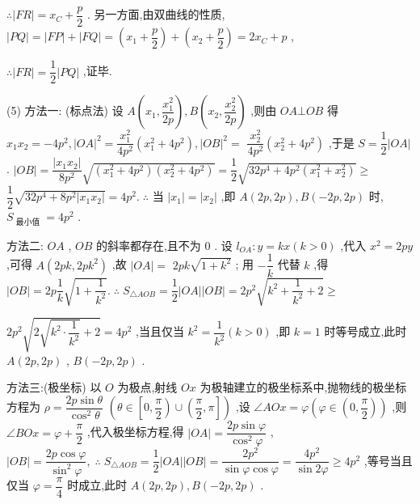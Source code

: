 $\therefore \left| {FR}\right|  = {x}_{C} + \dfrac{p}{2}$ . 另一方面,由双曲线的性质, $\left| {PQ}\right|  = \left| {FP}\right|  + \left| {FQ}\right|  = \left( {{x}_{1} + \dfrac{p}{2}}\right)  + \left( {{x}_{2} + \dfrac{p}{2}}\right)  = 2{x}_{C} + p$ ,

$\therefore \left| {FR}\right|  = \dfrac{1}{2}\left| {PQ}\right|$ ,证毕.

(5) 方法一: (标点法) 设 $A\left( {{x}_{1},\dfrac{{x}_{1}^{2}}{2p}}\right) ,B\left( {{x}_{2},\dfrac{{x}_{2}^{2}}{2p}}\right)$ ,则由 ${OA}\bot {OB}$ 得 ${x}_{1}{x}_{2} =  - 4{p}^{2},{\left| OA\right| }^{2} = \dfrac{{x}_{1}^{2}}{4{p}^{2}}\left( {{x}_{1}^{2} + 4{p}^{2}}\right) ,{\left| OB\right| }^{2} =$  $\dfrac{{x}_{2}^{2}}{4{p}^{2}}\left( {{x}_{2}^{2} + 4{p}^{2}}\right)$ ,于是 $S = \dfrac{1}{2}\left| {OA}\right|$ . $\left| {OB}\right|  = \dfrac{\left| {x}_{1}{x}_{2}\right| }{8{p}^{2}}\sqrt{\left( {{x}_{1}^{2} + 4{p}^{2}}\right) \left( {{x}_{2}^{2} + 4{p}^{2}}\right) } = \dfrac{1}{2}\sqrt{{32}{p}^{4} + 4{p}^{2}\left( {{x}_{1}^{2} + {x}_{2}^{2}}\right) } \geq$  $\dfrac{1}{2}\sqrt{{32}{p}^{4} + 8{p}^{2}\left| {{x}_{1}{x}_{2}}\right| } = 4{p}^{2}.\;\therefore$ 当 $\left| {x}_{1}\right|  = \left| {x}_{2}\right|$ ,即 $A\left( {{2p},{2p}}\right) ,B\left( {-{2p},{2p}}\right)$ 时, ${S}_{\text{ 最小值 }} = 4{p}^{2}$ .

方法二: ${OA}$ , ${OB}$ 的斜率都存在,且不为 0 . 设 ${l}_{OA} : y = {kx}\left( {k > 0}\right)$ ,代入 ${x}^{2} = {2py}$ ,可得 $A\left( {{2pk},{2p}{k}^{2}}\right)$ ,故 $\left| {OA}\right|  =$  ${2pk}\sqrt{1 + {k}^{2}}$ ; 用 $- \dfrac{1}{k}$ 代替 $k$ ,得 $\left| {OB}\right|  = {2p}\dfrac{1}{k}\sqrt{1 + \dfrac{1}{{k}^{2}}}.\;\therefore \;{S}_{\bigtriangleup {AOB}} = \dfrac{1}{2}\left| {OA}\right| \left| {OB}\right|  = 2{p}^{2}\sqrt{{k}^{2} + \dfrac{1}{{k}^{2}} + 2} \geq$

$2{p}^{2}\sqrt{2\sqrt{{k}^{2} \cdot  \dfrac{1}{{k}^{2}}} + 2} = 4{p}^{2}$ ,当且仅当 ${k}^{2} = \dfrac{1}{{k}^{2}}\left( {k > 0}\right)$ ,即 $k = 1$ 时等号成立,此时 $A\left( {{2p},{2p}}\right)$ , $B\left( {-{2p},{2p}}\right)$ .

方法三:(极坐标) 以 $O$ 为极点,射线 ${Ox}$ 为极轴建立的极坐标系中,抛物线的极坐标方程为 $\rho  = \dfrac{{2p}\sin \theta }{{\cos }^{2}\theta }$  $\left( {\theta  \in  \left\lbrack  {0,\dfrac{\pi }{2}}\right)  \cup  \left( {\dfrac{\pi }{2},\pi }\right\rbrack  }\right)$ ,设 $\angle {AOx} = \varphi \left( {\varphi  \in  \left( {0,\dfrac{\pi }{2}}\right) }\right)$ ,则 $\angle {BOx} = \varphi  + \dfrac{\pi }{2}$ ,代入极坐标方程,得 $\left| {OA}\right|  = \dfrac{{2p}\sin \varphi }{{\cos }^{2}\varphi }$ , $\left| {OB}\right|  = \dfrac{{2p}\cos \varphi }{{\sin }^{2}\varphi },\;\therefore \;{S}_{\bigtriangleup {AOB}} = \dfrac{1}{2}\left| {OA}\right| \left| {OB}\right|  = \dfrac{2{p}^{2}}{\sin \varphi \cos \varphi } = \dfrac{4{p}^{2}}{\sin {2\varphi }} \geq  4{p}^{2}$ ,等号当且仅当 $\varphi  = \dfrac{\pi }{4}$ 时成立,此时 $A\left( {{2p},{2p}}\right) ,B\left( {-{2p},{2p}}\right)$ .

